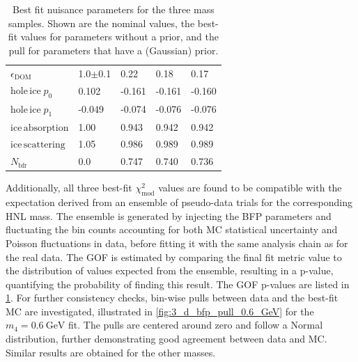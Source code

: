 \documentclass[
    aps,
    prd,
    reprint,
    amsmath,
    amssymb,
    nofootinbib,
    linenumbers,
    superscriptaddress,
    floatfix
]{revtex4-2}
\newcommand{\gev}{\giga\electronvolt}
\renewcommand{\rm}{\mathrm}
\newcommand{\rm}{\mathrm}
\begin{document}
\begin{table}[h]
\begin{tabular}{ ll lll }
    \hline
    $\epsilon_{\rm{DOM}}$                            &    1.0$\pm$0.1       &           0.22      &           0.18      &           0.17      \\ 
    $\rm{hole \, ice} \; p_0$                        &    0.102             &          -0.161     &          -0.161     &          -0.160     \\ 
    $\rm{hole \, ice} \; p_1$                        &   -0.049             &          -0.074     &          -0.076     &          -0.076     \\ 
    $\rm{ice \, absorption}$                         &    1.00              &           0.943     &           0.942     &           0.942     \\ 
    $\rm{ice \, scattering}$                         &    1.05              &           0.986     &           0.989     &           0.989     \\ 
    $N_\rm{bfr}$                                     &    0.0               &           0.747     &           0.740     &           0.736     \\
    \hline
    \end{tabular}
\caption{Best fit nuisance parameters for the three mass samples. Shown are the nominal values, the best-fit values for parameters without a prior, and the pull for parameters that have a (Gaussian) prior.}
\label{tab:best_fit_parameters}
\end{table}

Additionally, all three best-fit $\chi^2_{\mathrm{mod}}$ values are found to be compatible with the expectation derived from an ensemble of pseudo-data trials for the corresponding HNL mass.
The ensemble is generated by injecting the BFP parameters and fluctuating the bin counts accounting for both MC statistical uncertainty and Poisson fluctuations in data, before fitting it with the same analysis chain as for the real data.
The GOF is estimated by comparing the final fit metric value to the distribution of values expected from the ensemble, resulting in a p-value, quantifying the probability of finding this result. 
The GOF p-values are listed in \cref{tab:best_fit_parameters}. For further consistency checks, bin-wise pulls between data and the best-fit MC are investigated, illustrated in \cref{fig:3_d_bfp_pull_0.6_GeV} for the $m_{4}=\SI{0.6}{\gev}$ fit.
The pulls are centered around zero and follow a Normal distribution, further demonstrating good agreement between data and MC.
Similar results are obtained for the other masses.
\end{document}
